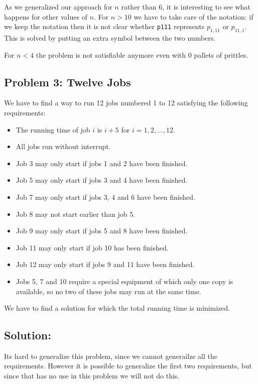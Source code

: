 \documentclass[12pt]{article}
\begin{document}
\noindent As we generalized our approach for $n$ rather than 6, it is
interesting to see what happens for other values of $n$. For $n
> 10$ we have to take care of the notation: if we keep the
notation then it is not clear whether {\tt p111} represents 
$p_{1,11}$ or $p_{11,1}$. This is solved by putting an extra 
symbol between the two numbers. 

For $n < 4$ the problem is not satisfiable anymore even with 0 pallets of prittles.

\subsection*{Problem 3: Twelve Jobs}

We have to find a way to run 12 jobs numbered 1 to 12 satisfying the following requirements:
\begin{itemize}
\item The running time of job $i$ is $i+5$ for $i = 1,2, \ldots ,12.$
\item All jobs run without interrupt.
\item Job 3 may only start if jobs 1 and 2 have been finished.
\item Job 5 may only start if jobs 3 and 4 have been finished.
\item Job 7 may only start if jobs 3, 4 and 6 have been finished.
\item Job 8 may not start earlier than job 5.
\item Job 9 may only start if jobs 5 and 8 have been finished.
\item Job 11 may only start if job 10 has been finished.
\item Job 12 may only start if jobs 9 and 11 have been finished.
\item Jobs 5, 7 and 10 require a special equipment of which only one copy is available, so no two of these jobs may run at the same time.
\end{itemize}
We have to find a solution for which the total running time is minimized. 

\vspace{8mm}

\subsection*{Solution:}
Its hard to generalize this problem, since we cannot generailze all the requirements. However it is possible to generalize the first two requirements, but since that has no use in this problem we will not do this. 
\end{document}
